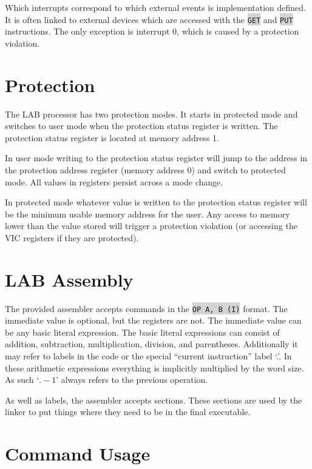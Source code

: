 \documentclass{article}
\newcommand{\labcode}[1]{\colorbox{lightgray}{\lstinline[language=lab]{#1}}}
\begin{document}
Which interrupts correspond to which external events is implementation defined.
It is often linked to external devices which are accessed with the \labcode{GET}
and \labcode{PUT} instructions. The only exception is interrupt 0, which is
caused by a protection violation.

\section{Protection}

The LAB processor has two protection modes. It starts in protected mode and
switches to user mode when the protection status register is written. The
protection status register is located at memory address 1.

In user mode writing to the protection status register will jump to the address
in the protection address register (memory address 0) and switch to protected
mode. All values in registers persist across a mode change.

In protected mode whatever value is written to the protection status register
will be the minimum usable memory address for the user. Any access to memory
lower than the value stored will trigger a protection violation (or accessing
the VIC registers if they are protected).

\section{LAB Assembly}

The provided assembler accepts commands in the \labcode{OP A, B (I)} format. The
immediate value is optional, but the registers are not. The immediate value can
be any basic literal expression. The basic literal expressions can consist of
addition, subtraction, multiplication, division, and parentheses. Additionally
it may refer to labels in the code or the special ``current instruction'' label
`.'. In these arithmetic expressions everything is implicitly multiplied by the
word size. As such `$.-1$' always refers to the previous operation.

As well as labels, the assembler accepts sections. These sections are used by
the linker to put things where they need to be in the final executable.


\section{Command Usage}
\end{document}

